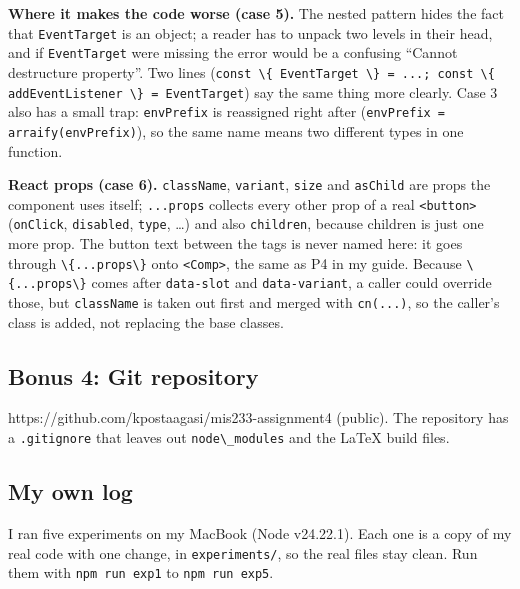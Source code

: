 \documentclass[
  11pt,
]{article}
\newcommand{\passthrough}[1]{#1}
\begin{document}
\textbf{Where it makes the code worse (case 5).} The nested pattern
hides the fact that \passthrough{\lstinline!EventTarget!} is an object;
a reader has to unpack two levels in their head, and if
\passthrough{\lstinline!EventTarget!} were missing the error would be a
confusing ``Cannot destructure property''. Two lines
(\passthrough{\lstinline!const \{ EventTarget \} = ...; const \{ addEventListener \} = EventTarget!})
say the same thing more clearly. Case 3 also has a small trap:
\passthrough{\lstinline!envPrefix!} is reassigned right after
(\passthrough{\lstinline!envPrefix = arraify(envPrefix)!}), so the same
name means two different types in one function.

\textbf{React props (case 6).} \passthrough{\lstinline!className!},
\passthrough{\lstinline!variant!}, \passthrough{\lstinline!size!} and
\passthrough{\lstinline!asChild!} are props the component uses itself;
\passthrough{\lstinline!...props!} collects every other prop of a real
\passthrough{\lstinline!<button>!} (\passthrough{\lstinline!onClick!},
\passthrough{\lstinline!disabled!}, \passthrough{\lstinline!type!},
\ldots) and also \passthrough{\lstinline!children!}, because children is
just one more prop. The button text between the tags is never named
here: it goes through \passthrough{\lstinline!\{...props\}!} onto
\passthrough{\lstinline!<Comp>!}, the same as P4 in my guide. Because
\passthrough{\lstinline!\{...props\}!} comes after
\passthrough{\lstinline!data-slot!} and
\passthrough{\lstinline!data-variant!}, a caller could override those,
but \passthrough{\lstinline!className!} is taken out first and merged
with \passthrough{\lstinline!cn(...)!}, so the caller's class is added,
not replacing the base classes.

\subsection{Bonus 4: Git repository}\label{bonus-4-git-repository}

https://github.com/kpostaagasi/mis233-assignment4 (public). The
repository has a \passthrough{\lstinline!.gitignore!} that leaves out
\passthrough{\lstinline!node\_modules!} and the LaTeX build files.

\subsection{My own log}\label{my-own-log}

I ran five experiments on my MacBook (Node v24.22.1). Each one is a copy
of my real code with one change, in
\passthrough{\lstinline!experiments/!}, so the real files stay clean.
Run them with \passthrough{\lstinline!npm run exp1!} to
\passthrough{\lstinline!npm run exp5!}.
\end{document}
